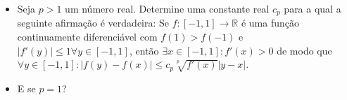 \begin{itemize}
\item[(a)] Seja \(p>1\) um número real. Determine uma constante real \(c_p\) para a qual a seguinte afirmação é verdadeira:
Se \(f\colon  [-1,1]\to\mathbb{R}\) é uma função continuamente diferenciável com \(f(1)>f(-1)\) e \(|f'(y)|\le1 \forall y\in[-1,1]\), então \(\exists x\in[-1,1]: f'(x)>0\) de modo que \(\forall y\in[-1,1]: |f(y)-f(x)|\le c_p\sqrt[p]{f'(x)}|y-x|\).

\item[(b)] E se \(p=1\)?
\end{itemize}
